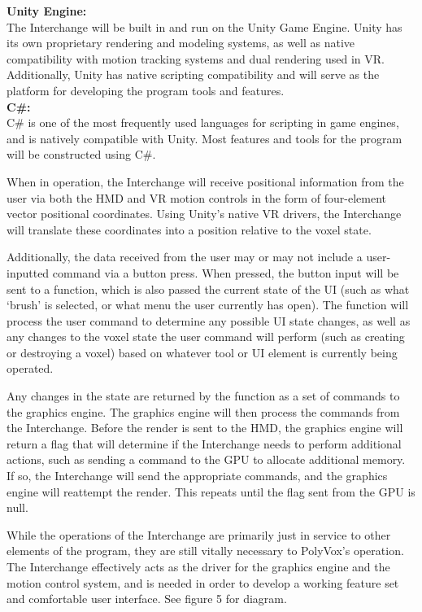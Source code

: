 \documentclass[onecolumn, draftclsnofoot,10pt, compsoc]{IEEEtran}
\newcounter{threesection}[subsubsection]
\newcounter{foursection}[threesection]
\begin{document}
\textbf{Unity Engine:}\\
The Interchange will be built in and run on the Unity Game Engine. Unity has its own proprietary rendering and modeling systems, as well as native compatibility with motion tracking systems and dual rendering used in VR. Additionally, Unity has native scripting compatibility and will serve as the platform for developing the program tools and features.\cite{unity}\\
\textbf{C\#:}\\
C\# is one of the most frequently used languages for scripting in game engines, and is natively compatible with Unity. Most features and tools for the program will be constructed using C\#. 

When in operation, the Interchange will receive positional information from the user via both the HMD and VR motion controls in the form of four-element vector positional coordinates. Using Unity’s native VR drivers, the Interchange will translate these coordinates into a position relative to the voxel state.

Additionally, the data received from the user may or may not include a user-inputted command via a button press. When pressed, the button input will be sent to a function, which is also passed the current state of the UI (such as what ‘brush’ is selected, or what menu the user currently has open). The function will process the user command to determine any possible UI state changes, as well as any changes to the voxel state the user command will perform (such as creating or destroying a voxel) based on whatever tool or UI element is currently being operated. 

Any changes in the state are returned by the function as a set of commands to the graphics engine. The graphics engine will then process the commands from the Interchange. Before the render is sent to the HMD, the graphics engine will return a flag that will determine if the Interchange needs to perform additional actions, such as sending a command to the GPU to allocate additional memory. If so, the Interchange will send the appropriate commands, and the graphics engine will reattempt the render. This repeats until the flag sent from the GPU is null. 

While the operations of the Interchange are primarily just in service to other elements of the program, they are still vitally necessary to PolyVox’s operation. The Interchange effectively acts as the driver for the graphics engine and the motion control system, and is needed in order to develop a working feature set and comfortable user interface. See figure 5 for diagram.
\end{document}
